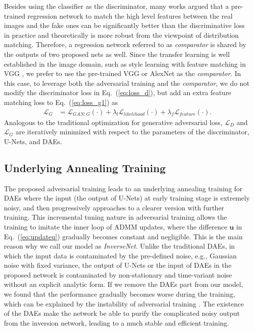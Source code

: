 \documentclass[10pt,twocolumn,letterpaper]{article}
\begin{document}
Besides using the classifier as the discriminator, many works \cite{salimans2016improved, arjovsky2017wasserstein} argued that 
a pre-trained regression network to match the high level features between the real images and the fake ones can be significantly 
better than the discriminative loss in practice and theoretically is more robust from the viewpoint of distribution matching. 
Therefore, a regression network referred to as \emph{comparator} is shared by the outputs of two proposed nets as well. 
Since the transfer learning is well established in the image domain, such as style learning with feature matching \cite{gatys2015neural} in VGG \cite{simonyan2014very}, we prefer to use the pre-trained VGG or AlexNet \cite{krizhevsky2012imagenet} as the \emph{comparator}. 
In this case, to leverage both the adversarial training and the \emph{comparator}, we do not modify the discriminator loss in Eq.~(\ref{eq:loss_d}), but add an extra feature matching loss to Eq.~(\ref{eq:loss_g1}) as
\begin{align}
\mathcal{L}_G & = \mathcal{L}_{GAN:G}(\cdot) + \lambda_l\mathcal{L}_{likelihood}(\cdot) + \lambda_f \mathcal{L}_{feature}(\cdot). \label{eq:loss_g2}
\end{align}
Analogous to the traditional optimization for generative adversarial loss, %
$\mathcal{L}_D$ and $\mathcal{L}_G$ are iteratively minimized with respect to the parameters of the discriminator, U-Nets, and DAEs.  

\subsection{Underlying Annealing Training}
The proposed adversarial training leads to an underlying annealing training for DAEs where the input (the output of U-Nets) at early training stage is extremely noisy, and then progressively approaches to a clearer version with further training. 
This incremental tuning nature in adversarial training allows the training to imitate the inner loop of ADMM updates, 
where the difference $\mathbf{u}$ in Eq.~(\ref{eq:updateu}) gradually becomes constant and negligible. 
This is the main reason why we call our model as \textit{InverseNet}. 
Unlike the traditional DAEs, in which the input data is contaminated by the pre-defined noise, e.g., Gaussian noise with fixed variance,
the output of U-Nets or the input of DAEs in the proposed network is contaminated by non-stationary and time-variant noise without an explicit analytic form. If we remove the DAEs part from our model, we found that the performance gradually becomes worse 
during the training, which can be explained by the instability of adversarial training \cite{arjovsky2017wasserstein}. 
The existence of the DAEs make the network be able to purify the complicated noisy output from the inversion network, leading to a much stable and efficient training. %
\end{document}
